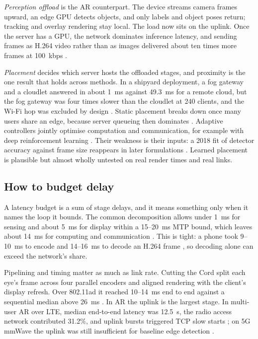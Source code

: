 \emph{Perception offload} is the AR counterpart. The device streams camera frames upward, an edge GPU
detects objects, and only labels and object poses return; tracking and overlay rendering stay local. The
load now sits on the uplink. Once the server has a GPU, the network dominates inference latency, and
sending frames as H.264 video rather than as images delivered about ten times more frames at 100~kbps
\cite{W2792220137}.

\emph{Placement} decides which server hosts the offloaded stages, and proximity is the one result that
holds across methods. In a shipyard deployment, a fog gateway and a cloudlet answered in about 1~ms
against 49.3~ms for a remote cloud, but the fog gateway was four times slower than the cloudlet at 240
clients, and the Wi-Fi hop was excluded by design \cite{W2805833065}. Static
placement breaks down once many users share an edge, because server queueing then dominates
\cite{W4213053765}. Adaptive controllers jointly optimise computation and communication, for example
with deep reinforcement learning \cite{W3120265095}. Their weakness is their inputs: a 2018 fit of
detector accuracy against frame size \cite{W2790412025} reappears in later formulations
\cite{W4388068949}. Learned placement is plausible but almost wholly untested on real render times and
real links.

\subsection{How to budget delay}

A latency budget is a sum of stage delays, and it means something only when it names the loop it bounds.
The common decomposition allows under 1~ms for sensing and about 5~ms for display within a 15--20~ms MTP
bound, which leaves about 14~ms for computing and communication \cite{W2784711283}. This is tight: a phone took 9--10~ms to encode and 14--16~ms to decode an H.264 frame
\cite{W2940859338}, so decoding alone can exceed the network's share.

Pipelining and timing matter as much as link rate. Cutting the Cord split each eye's frame across four
parallel encoders and aligned rendering with the client's display refresh. Over 802.11ad it reached
10--14~ms end to end against a sequential median above 26~ms \cite{W2838572662}. In AR the uplink is the largest stage. In multi-user AR over LTE, median end-to-end latency was 12.5~s, the radio
access network contributed 31.2\%, and uplink bursts triggered TCP slow starts \cite{W3047439371}; on 5G
mmWave the uplink was still insufficient for baseline edge detection \cite{W4390905995}.


